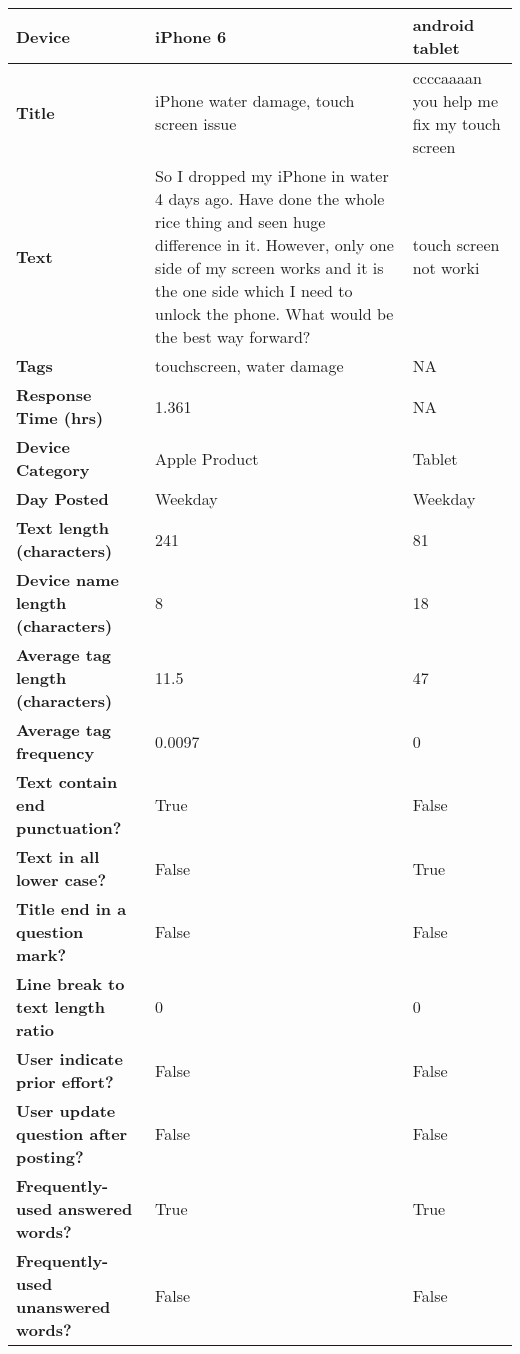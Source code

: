 \documentclass[]{interact}\usepackage[]{graphicx}\usepackage[]{color}
\begin{document}
\begin{table}[p]%
{}
{\begin{tabular}{|L{4cm}|L{5cm}|L{5cm}|}
\hline
\textbf{Device} & iPhone 6 & android tablet \\ \hline
\textbf{Title} & iPhone water damage, touch screen issue & ccccaaaan you help me fix my touch screen \\ \hline
\textbf{Text} & So I dropped my iPhone in water 4 days ago. Have done the whole rice thing and seen huge difference in it. However, only one side of my screen works and it is the one side which I need to unlock the phone. What would be the best way forward? & touch screen not worki\\ \hline
\textbf{Tags} & touchscreen, water damage & NA\\ \hline
\textbf{Response Time (hrs)} & 1.361 & NA \\ \hline 
\textbf{Device Category} & Apple Product & Tablet \\ \hline
\textbf{Day Posted} & Weekday & Weekday \\ \hline
\textbf{Text length (characters)} & 241 & 81 \\ \hline
\textbf{Device name length (characters)} & 8 & 18\\ \hline
\textbf{Average tag length (characters)} & 11.5 & 47 \\ \hline
\textbf{Average tag frequency} & 0.0097 & 0 \\ \hline
\textbf{Text contain end punctuation?} & True & False \\ \hline
\textbf{Text in all lower case?} & False & True \\ \hline
\textbf{Title end in a question mark?} & False & False \\ \hline
\textbf{Line break to text length ratio} & 0 & 0 \\ \hline
\textbf{User indicate prior effort?} & False & False \\ \hline
\textbf{User update question after posting?} & False & False \\ \hline
\textbf{Frequently-used answered words?} & True & True \\ \hline
\textbf{Frequently-used unanswered words?} & False & False \\ \hline
\end{tabular}}
\label{table:5}
\end{table}
\end{document}
